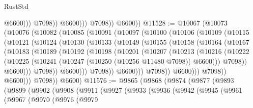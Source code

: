 \begin{lexlean}{RustStd}
\begin{coremodule}
                            @6600)))
                      @7098))
                  @6600)))
            @7098))
        @6600))
@11528 := @10067
    (@10073
      (@10076
        (@10082
          (@10085
            (@10091
              (@10097
                (@10100
                  (@10106
                    (@10109
                      (@10115
                        (@10121
                          (@10124
                            (@10130
                              (@10133
                                (@10149
                                  (@10155
                                    (@10158
                                      (@10164
                                        (@10167
                                          (@10183
                                            (@10189
                                              (@10192
                                                (@10198
                                                  (@10201
                                                    (@10207
                                                      (@10213
                                                        (@10216
                                                          (@10222
                                                            (@10225
                                                              (@10241
                                                                (@10247
                                                                  (@10250 (@10256 @11480 @7098))
                                                                  @6600)))
                                                            @7098))
                                                        @6600)))
                                                  @7098))
                                              @6600)))
                                        @7098))
                                    @6600)))
                              @7098))
                          @6600)))
                    @7098))
                @6600)))
          @7098))
      @6600)
@11576 := @9865
    (@9868
      (@9874
        (@9877
          (@9893
            (@9899
              (@9902
                (@9908
                  (@9911
                    (@9927
                      (@9933
                        (@9936
                          (@9942
                            (@9945
                              (@9961
                                (@9967
                                  (@9970
                                    (@9976
                                      (@9979

\end{coremodule}
\end{lexlean}
